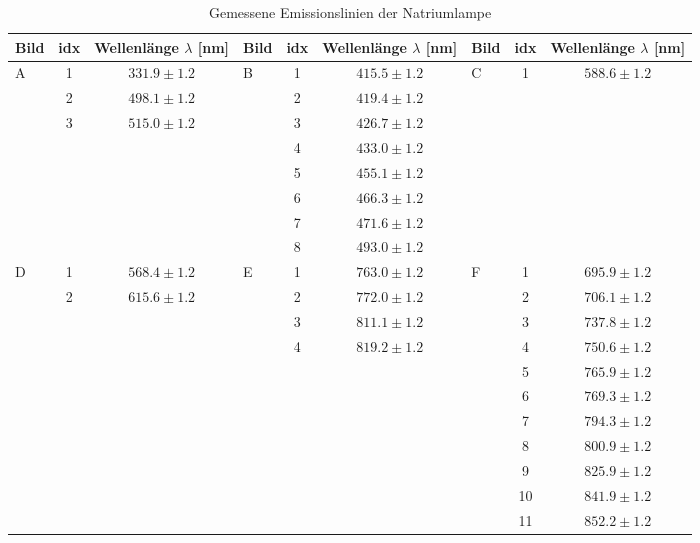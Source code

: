 \begin{table}[h!]
    \caption{Gemessene Emissionslinien der Natriumlampe}
    \centering
    \label{tab:Emissionslinien_Na}
    \begin{tabular}{l | c | c || l | c | c || l | c | c}
        \toprule
        Bild & idx & Wellenlänge $\lambda$ [nm] & Bild & idx & Wellenlänge $\lambda$ [nm] & Bild & idx & Wellenlänge $\lambda$ [nm] \\
        \midrule
        A & 1 & $331.9 \pm 1.2$ & B & 1 & $415.5 \pm 1.2$ & C & 1 & $588.6 \pm 1.2$ \\
        & 2 & $498.1 \pm 1.2$ &  & 2 & $419.4 \pm 1.2$ &  &  &  \\
        & 3 & $515.0 \pm 1.2$ &  & 3 & $426.7 \pm 1.2$ &  &  &  \\
        &  &  &  & 4 & $433.0 \pm 1.2$ &  &  &  \\
        &  &  &  & 5 & $455.1 \pm 1.2$ &  &  &  \\
        &  &  &  & 6 & $466.3 \pm 1.2$ &  &  &  \\
        &  &  &  & 7 & $471.6 \pm 1.2$ &  &  &  \\
        &  &  &  & 8 & $493.0 \pm 1.2$ &  &  &  \\
        \midrule
        D & 1 & $568.4 \pm 1.2$ & E & 1 & $763.0 \pm 1.2$ & F & 1 & $695.9 \pm 1.2$ \\
        & 2 & $615.6 \pm 1.2$ &  & 2 & $772.0 \pm 1.2$ &  & 2 & $706.1 \pm 1.2$ \\
        &  &  &  & 3 & $811.1 \pm 1.2$ &  & 3 & $737.8 \pm 1.2$ \\
        &  &  &  & 4 & $819.2 \pm 1.2$ &  & 4 & $750.6 \pm 1.2$ \\
        &  &  &  &  &  &  & 5 & $765.9 \pm 1.2$ \\
        &  &  &  &  &  &  & 6 & $769.3 \pm 1.2$ \\
        &  &  &  &  &  &  & 7 & $794.3 \pm 1.2$ \\
        &  &  &  &  &  &  & 8 & $800.9 \pm 1.2$ \\
        &  &  &  &  &  &  & 9 & $825.9 \pm 1.2$ \\
        &  &  &  &  &  &  & 10 & $841.9 \pm 1.2$ \\
        &  &  &  &  &  &  & 11 & $852.2 \pm 1.2$ \\
        \bottomrule
        \end{tabular}
\end{table}


